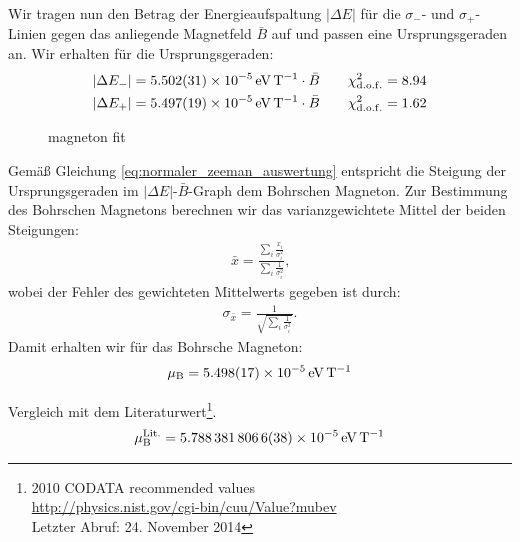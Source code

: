 \documentclass[11pt, a4paper]{article}
\begin{document}
Wir tragen nun den Betrag der Energieaufspaltung $|\Delta E|$ für die $\sigma_-$- und $\sigma_+$-Linien gegen das anliegende Magnetfeld $\bar{B}$ auf und passen eine Ursprungsgeraden an.
Wir erhalten für die Ursprungsgeraden:
\begin{align}
	|\Delta E_{-}| = \SI{5.502 +- 0.031e-5}{\electronvolt\per\tesla} \cdot \bar{B} \qquad \chi_\mathrm{d.o.f.}^2 = 8.94\\
	|\Delta E_{+}| = \SI{5.497 +- 0.019e-5}{\electronvolt\per\tesla} \cdot \bar{B} \qquad \chi_\mathrm{d.o.f.}^2 = 1.62
\end{align}
\begin{figure}[h]
	\centering
	
	\caption{magneton fit}
	\label{fig:magneton_fit}
\end{figure}
Gemäß Gleichung \ref{eq:normaler_zeeman_auswertung} entspricht die Steigung der Ursprungsgeraden im $|\Delta E|$-$\bar{B}$-Graph dem Bohrschen Magneton. Zur Bestimmung des Bohrschen Magnetons berechnen wir das varianzgewichtete Mittel der beiden Steigungen:
\begin{align}
	\bar{x} = \frac{\sum_i \frac{x_i}{\sigma_i^2}}{\sum_i \frac{1}{\sigma_i^2}}\text{,}
\end{align}
wobei der Fehler des gewichteten Mittelwerts gegeben ist durch:
\begin{align}
	\sigma_{\bar{x}} = \frac{1}{\sqrt{\sum_i \frac{1}{\sigma_i^2}}}\text{.}
\end{align}
Damit erhalten wir für das Bohrsche Magneton:
\begin{align}
	\mu_\mathrm{B} = \SI{5.498 +- 0.017e-5}{\electronvolt\per\tesla}
\end{align}

Vergleich mit dem Literaturwert\footnote{2010 CODATA recommended values\\ \url{http://physics.nist.gov/cgi-bin/cuu/Value?mubev}\\ Letzter Abruf: 24. November 2014}.
\begin{align}
	\mu_\mathrm{B}^{\mathrm{Lit.}} = \SI{5.7883818066 +- 0.0000000038e-5}{\electronvolt\per\tesla}
\end{align}
\end{document}
